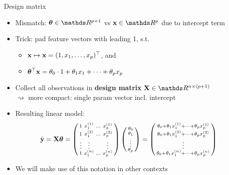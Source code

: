 \documentclass[11pt,compress,t,notes=noshow, xcolor=table]{beamer}
\begin{document}
\begin{vbframe}{Design matrix}

\begin{itemize}
    \item Mismatch: $\thetab \in \R^{p + 1}$ vs $\xv \in \R^p$ due to intercept  
    term
    \item Trick: pad feature vectors with leading 1, s.t. 
    \begin{itemize}
        \item $\mathbf{x} \mapsto \mathbf{x} = (1, x_1, \dots, x_p)^\top$, and 
        \item $\bm{\theta}^\top \mathbf{x} = \theta_0 \cdot 1 + \theta_1 x_1 + \dots + \theta_p x_p$
    \end{itemize}
    \item Collect all observations in \textbf{design matrix} 
    $\Xmat \in \R^{n \times (p + 1)}$ \\
    $\rightsquigarrow$ more compact: single param vector incl. intercept
    \item Resulting linear model:
    \begin{align*}
    \hat {\mathbf{y}} = \mathbf{X} \bm{\theta} = 
        \left(
        \begin{smallmatrix}
            1 & x^{(1)}_1 & \ldots & x^{(1)}_p \\
            1 & x^{(2)}_1 & \ldots & x^{(2)}_p \\
            \vdots & \vdots & & \vdots \\
            1 & x^{(n)}_1 & \ldots & x^{(n)}_p \\
        \end{smallmatrix}
        \right)
        \left(
        \begin{smallmatrix}
            \theta_0 \\ \theta_1 \\ \vdots \\ \theta_p
        \end{smallmatrix}
        \right)
        &=
        \left(
        \begin{smallmatrix}
            \theta_0 + \theta_1 x_1^{(1)} + \dots + \theta_p x_p^{(1)} \\
            \theta_0 + \theta_1 x_1^{(2)} + \dots + \theta_p x_p^{(2)} \\
            \vdots \\
            \theta_0 + \theta_1 x_1^{(n)} + \dots + \theta_p x_p^{(n)} \\
        \end{smallmatrix}
        \right)
    \end{align*}
    \item We will make use of this notation in other contexts
\end{itemize}

\end{vbframe}
\end{document}
